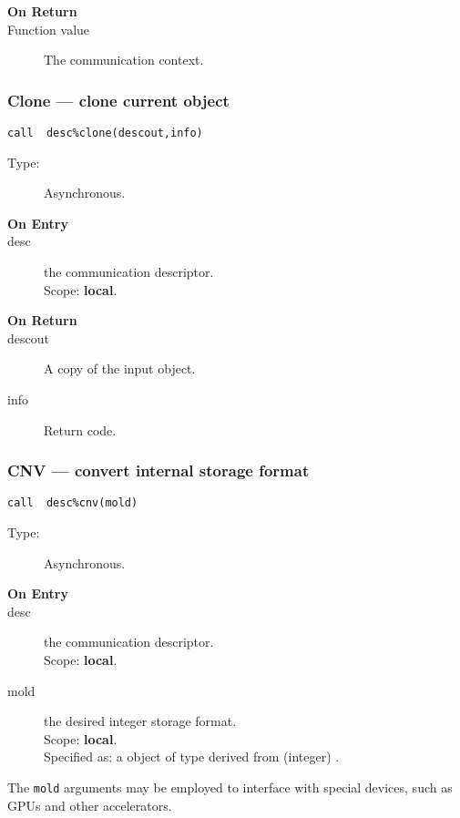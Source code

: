 \begin{description}
\item[\bf On Return]
\item[Function value] The communication context.
\end{description}

\subsubsection{Clone --- clone current object}

\begin{verbatim}
call  desc%clone(descout,info)
\end{verbatim}

\begin{description}
\item[Type:] Asynchronous.
\item[\bf On Entry]
\item[desc] the communication descriptor.\\
Scope: {\bf local}.\\
\end{description}

\begin{description}
\item[\bf On Return]
\item[descout] A copy of the input object.
\item[info] Return code. 
\end{description}


\subsubsection{CNV --- convert internal storage format}

\begin{verbatim}
call  desc%cnv(mold)
\end{verbatim}

\begin{description}
\item[Type:] Asynchronous.
\item[\bf On Entry]
\item[desc] the communication descriptor.\\
Scope: {\bf local}.\\
\item[mold] the desired integer storage format.\\
Scope: {\bf local}.\\
Specified as: a object of type derived from (integer) \vbasedata.
\end{description}
The \verb|mold|  arguments may be
employed to interface with special devices, such as GPUs and other
accelerators. 



